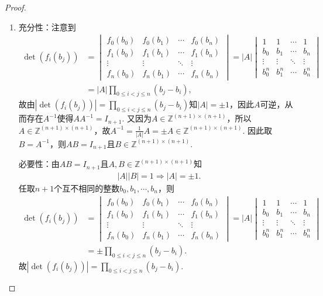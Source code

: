 \documentclass[../../main.tex]{subfiles}%
\begin{document}
\begin{proof}
\begin{enumerate}[(1)]
\item {\heiti 充分性：}注意到
\begin{align*}
\det(f_i(b_j))&=\begin{vmatrix}
f_0(b_0)&f_0(b_1)&\cdots&f_0(b_n)\\
f_1(b_0)&f_1(b_1)&\cdots&f_1(b_n)\\
\vdots&\vdots&\ddots&\vdots\\
f_n(b_0)&f_n(b_1)&\cdots&f_n(b_n)
\end{vmatrix}=|A|\begin{vmatrix}
1&1&\cdots&1\\
b_0&b_1&\cdots&b_n\\
\vdots&\vdots&\ddots&\vdots\\
b_0^n&b_1^n&\cdots&b_n^n
\end{vmatrix}\\
&=|A|\prod_{0\leqslant i<j\leqslant n}(b_j-b_i),
\end{align*}
故由$|\det(f_i(b_j))|=\prod_{0\leqslant i<j\leqslant n}(b_j-b_i)$知$|A|=\pm 1$，因此$A$可逆，从而存在$A^{-1}$使得$AA^{-1}=I_{n+1}$. 又因为$A\in \mathbb{Z}^{(n+1)\times(n+1)}$，所以$A\in \mathbb{Z}^{(n+1)\times(n+1)}$，故$A^{-1}=\frac{1}{|A|}A=\pm A\in \mathbb{Z}^{(n+1)\times(n+1)}$. 因此取$B=A^{-1}$，则$AB=I_{n+1}$且$B\in \mathbb{Z}^{(n+1)\times(n+1)}$.

{\heiti 必要性：}由$AB=I_{n+1}$且$A,B\in \mathbb{Z}^{(n+1)\times(n+1)}$知
\begin{align*}
|A||B|=1\Longrightarrow |A|=\pm 1.
\end{align*}
任取$n+1$个互不相同的整数$b_0,b_1,\cdots,b_n$，则
\begin{align*}
\det(f_i(b_j))&=\begin{vmatrix}
f_0(b_0)&f_0(b_1)&\cdots&f_0(b_n)\\
f_1(b_0)&f_1(b_1)&\cdots&f_1(b_n)\\
\vdots&\vdots&\ddots&\vdots\\
f_n(b_0)&f_n(b_1)&\cdots&f_n(b_n)
\end{vmatrix}=|A|\begin{vmatrix}
1&1&\cdots&1\\
b_0&b_1&\cdots&b_n\\
\vdots&\vdots&\ddots&\vdots\\
b_0^n&b_1^n&\cdots&b_n^n
\end{vmatrix}\\
&=\pm \prod_{0\leqslant i<j\leqslant n}(b_j-b_i).
\end{align*}
故$|\det(f_i(b_j))|=\prod_{0\leqslant i<j\leqslant n}(b_j-b_i)$.
\end{enumerate}
\end{proof}
\end{document}
